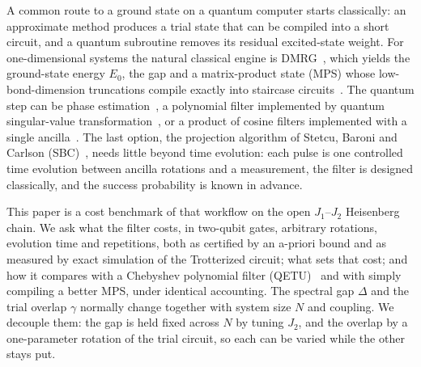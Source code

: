 \documentclass[aps,pra,twocolumn,superscriptaddress,nofootinbib]{revtex4-2}
\begin{document}
A common route to a ground state on a quantum computer starts classically: an approximate method
produces a trial state that can be compiled into a short circuit, and a quantum subroutine removes its
residual excited-state weight. For one-dimensional systems the natural classical engine is
DMRG~\cite{White1992,Schollwock2011}, which yields the ground-state energy $E_0$, the gap and a
matrix-product state (MPS) whose low-bond-dimension truncations compile exactly into staircase
circuits~\cite{Ran2020}. The quantum step can be phase estimation~\cite{Ge2019}, a polynomial filter
implemented by quantum singular-value transformation~\cite{Lin2020,Gilyen2019,Dong2022}, or a product of
cosine filters implemented with a single ancilla~\cite{Stetcu2023,Choi2021}. The last option, the projection
algorithm of Stetcu, Baroni and Carlson (SBC)~\cite{Stetcu2023}, needs little beyond time evolution: each
pulse is one controlled time evolution between ancilla rotations and a measurement, the filter is designed
classically, and the success probability is known in advance.

This paper is a cost benchmark of that workflow on the open $J_1$--$J_2$ Heisenberg chain. We ask what the
filter costs, in two-qubit gates, arbitrary rotations, evolution time and repetitions, both as certified by an
a-priori bound and as measured by exact simulation of the Trotterized circuit; what sets that cost; and how it
compares with a Chebyshev polynomial filter (QETU)~\cite{Dong2022} and with simply compiling a better MPS, under
identical accounting. The spectral gap
$\Delta$ and the trial overlap $\gamma$ normally change together with system size $N$ and coupling. We decouple
them: the gap is held fixed across $N$ by tuning $J_2$, and the overlap by a one-parameter rotation of the trial
circuit, so each can be varied while the other stays put.
\end{document}
